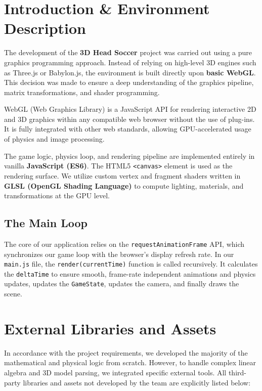 \documentclass[10pt]{book}
\begin{document}
\newpage
\tableofcontents

\chapter{Introduction \& Environment Description}

The development of the \textbf{3D Head Soccer} project was carried out using a pure graphics programming approach. Instead of relying on high-level 3D engines such as Three.js or Babylon.js, the environment is built directly upon \textbf{basic WebGL}. This decision was made to ensure a deep understanding of the graphics pipeline, matrix transformations, and shader programming.

\begin{definicion}
    WebGL (Web Graphics Library) is a JavaScript API for rendering interactive 2D and 3D graphics within any compatible web browser without the use of plug-ins. It is fully integrated with other web standards, allowing GPU-accelerated usage of physics and image processing.
\end{definicion}

The game logic, physics loop, and rendering pipeline are implemented entirely in vanilla \textbf{JavaScript (ES6)}. The HTML5 \texttt{<canvas>} element is used as the rendering surface. We utilize custom vertex and fragment shaders written in \textbf{GLSL (OpenGL Shading Language)} to compute lighting, materials, and transformations at the GPU level.

\section{The Main Loop}
The core of our application relies on the \texttt{requestAnimationFrame} API, which synchronizes our game loop with the browser's display refresh rate. In our \texttt{main.js} file, the \texttt{render(currentTime)} function is called recursively. It calculates the \texttt{deltaTime} to ensure smooth, frame-rate independent animations and physics updates, updates the \texttt{GameState}, updates the camera, and finally draws the scene.

\chapter{External Libraries and Assets}

In accordance with the project requirements, we developed the majority of the mathematical and physical logic from scratch. However, to handle complex linear algebra and 3D model parsing, we integrated specific external tools. All third-party libraries and assets not developed by the team are explicitly listed below:
\end{document}
